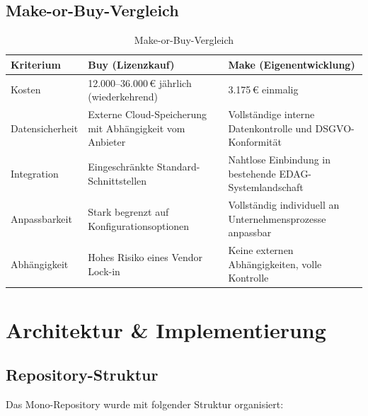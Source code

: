 \subsection{Make-or-Buy-Vergleich}

\begin{table}[H]
\centering
\footnotesize
{}
\begin{tabularx}{\textwidth}{|p{3cm}|X|X|}
\hline
\rowcolor{EDAGDunkelgrau!10}
\textbf{Kriterium} & \textbf{Buy (Lizenzkauf)} & \textbf{Make (Eigenentwicklung)} \\
\hline
Kosten & 12.000--36.000\,€ jährlich (wiederkehrend) & 3.175\,€ einmalig \\
\hline
Datensicherheit & Externe Cloud-Speicherung mit Abhängigkeit vom Anbieter & Vollständige interne Datenkontrolle und DSGVO-Konformität \\
\hline
Integration & Eingeschränkte Standard-Schnittstellen & Nahtlose Einbindung in bestehende EDAG-Systemlandschaft \\
\hline
Anpassbarkeit & Stark begrenzt auf Konfigurationsoptionen & Vollständig individuell an Unternehmensprozesse anpassbar \\
\hline
Abhängigkeit & Hohes Risiko eines Vendor Lock-in & Keine externen Abhängigkeiten, volle Kontrolle \\
\hline
\end{tabularx}
\caption{Make-or-Buy-Vergleich}
\label{tab:make_or_buy_detail}
\end{table}


\section{Architektur \& Implementierung}

\subsection{Repository-Struktur}

Das Mono-Repository wurde mit folgender Struktur organisiert:

